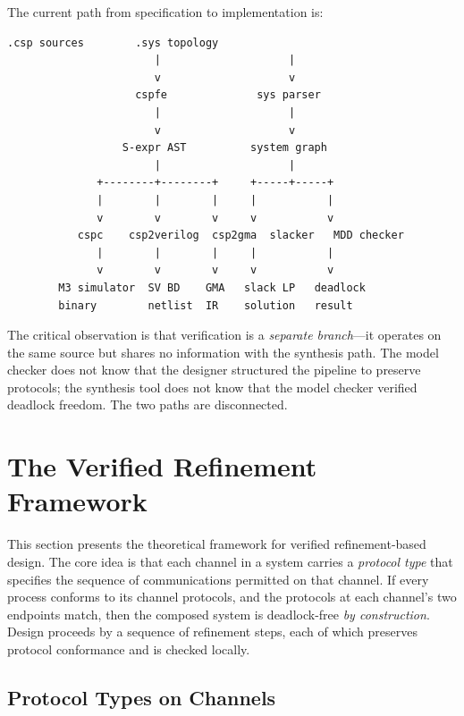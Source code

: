 \documentclass[11pt]{article}
\begin{document}
The current path from specification to implementation is:

\begin{Verbatim}[samepage=true]
                  .csp sources        .sys topology
                       |                    |
                       v                    v
                    cspfe              sys parser
                       |                    |
                       v                    v
                  S-expr AST          system graph
                       |                    |
              +--------+--------+     +-----+-----+
              |        |        |     |           |
              v        v        v     v           v
           cspc    csp2verilog  csp2gma  slacker   MDD checker
              |        |        |     |           |
              v        v        v     v           v
        M3 simulator  SV BD    GMA   slack LP   deadlock
        binary        netlist  IR    solution   result
\end{Verbatim}

The critical observation is that verification is a \emph{separate
branch}---it operates on the same source but shares no information
with the synthesis path.  The model checker does not know that the
designer structured the pipeline to preserve protocols; the synthesis
tool does not know that the model checker verified deadlock freedom.
The two paths are disconnected.

\section{The Verified Refinement Framework}
\label{sec:framework}

This section presents the theoretical framework for verified
refinement-based design.  The core idea is that each channel in a
system carries a \emph{protocol type} that specifies the sequence of
communications permitted on that channel.  If every process conforms
to its channel protocols, and the protocols at each channel's two
endpoints match, then the composed system is deadlock-free
\emph{by construction}.  Design proceeds by a sequence of
refinement steps, each of which preserves protocol conformance and is
checked locally.

\subsection{Protocol Types on Channels}
\label{sec:protocol-types}
\end{document}
